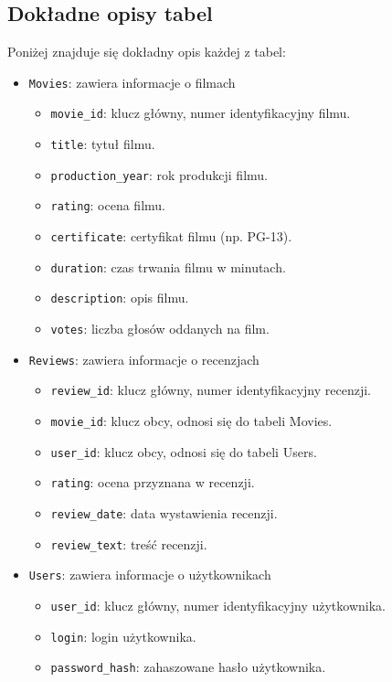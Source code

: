 \documentclass[../main.tex]{subfiles}
\begin{document}
\subsection{Dokładne opisy tabel}
Poniżej znajduje się dokładny opis każdej z tabel:
\begin{itemize}
	\item \texttt{Movies}: zawiera informacje o filmach
	      \begin{itemize}
		      \item \texttt{movie\_id}: klucz główny, numer identyfikacyjny filmu.
		      \item \texttt{title}: tytuł filmu.
		      \item \texttt{production\_year}: rok produkcji filmu.
		      \item \texttt{rating}: ocena filmu.
		      \item \texttt{certificate}: certyfikat filmu (np. PG-13).
		      \item \texttt{duration}: czas trwania filmu w minutach.
		      \item \texttt{description}: opis filmu.
		      \item \texttt{votes}: liczba głosów oddanych na film.
	      \end{itemize}
	\item \texttt{Reviews}: zawiera informacje o recenzjach
	      \begin{itemize}
		      \item \texttt{review\_id}: klucz główny, numer identyfikacyjny recenzji.
		      \item \texttt{movie\_id}: klucz obcy, odnosi się do tabeli Movies.
		      \item \texttt{user\_id}: klucz obcy, odnosi się do tabeli Users.
		      \item \texttt{rating}: ocena przyznana w recenzji.
		      \item \texttt{review\_date}: data wystawienia recenzji.
		      \item \texttt{review\_text}: treść recenzji.
	      \end{itemize}
	\item \texttt{Users}: zawiera informacje o użytkownikach
	      \begin{itemize}
		      \item \texttt{user\_id}: klucz główny, numer identyfikacyjny użytkownika.
		      \item \texttt{login}: login użytkownika.
		      \item \texttt{password\_hash}: zahaszowane hasło użytkownika.

\end{itemize}
\end{itemize}
\end{document}
